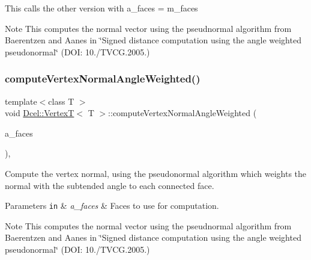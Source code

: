 This calls the other version with a\+\_\+faces = m\+\_\+faces \begin{DoxyNote}{Note}
This computes the normal vector using the pseudnormal algorithm from Baerentzen and Aanes in \char`\"{}\+Signed distance computation using the angle weighted pseudonormal\char`\"{} (D\+OI\+: 10./\+T\+V\+CG.2005.) 
\end{DoxyNote}
\mbox{\label{classDcel_1_1VertexT_aea793773eec08852108d3bd5c4eea5a9}} 
\subsubsection{\texorpdfstring{compute\+Vertex\+Normal\+Angle\+Weighted()}{computeVertexNormalAngleWeighted()}\hspace{0.1cm}{\footnotesize\ttfamily [2/2]}}
{\footnotesize\ttfamily template$<$class T $>$ \\
void \hyperlink{classDcel_1_1VertexT}{Dcel\+::\+VertexT}$<$ T $>$\+::compute\+Vertex\+Normal\+Angle\+Weighted (\begin{DoxyParamCaption}\item[{const std\+::vector$<$ \hyperlink{classDcel_1_1VertexT_a5acb4c66c49319683c71f52e56ad8e8a}{Face\+Ptr} $>$ \&}]{a\+\_\+faces }\end{DoxyParamCaption})\hspace{0.3cm}{\ttfamily [inline]}, {\ttfamily [noexcept]}}



Compute the vertex normal, using the pseudonormal algorithm which weights the normal with the subtended angle to each connected face. 


\begin{DoxyParams}[1]{Parameters}
\mbox{\tt in}  & {\em a\+\_\+faces} & Faces to use for computation. \\
\hline
\end{DoxyParams}
\begin{DoxyNote}{Note}
This computes the normal vector using the pseudnormal algorithm from Baerentzen and Aanes in \char`\"{}\+Signed distance computation using the angle weighted pseudonormal\char`\"{} (D\+OI\+: 10./\+T\+V\+CG.2005.) 
\end{DoxyNote}
\mbox{\label{classDcel_1_1VertexT_a6faffb2c5038d62c2f7866736ebe7393}} 

